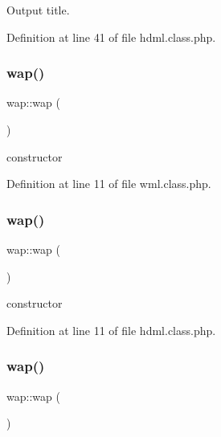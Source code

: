 Output title. 



Definition at line 41 of file hdml.\+class.\+php.

\mbox{\label{classwap_a7b4befeef8257c63a0ffe3012a84560b}} 
\subsubsection{\texorpdfstring{wap()}{wap()}\hspace{0.1cm}{\footnotesize\ttfamily [1/3]}}
{\footnotesize\ttfamily wap\+::wap (\begin{DoxyParamCaption}{ }\end{DoxyParamCaption})}



constructor 



Definition at line 11 of file wml.\+class.\+php.

\mbox{\label{classwap_a7b4befeef8257c63a0ffe3012a84560b}} 
\subsubsection{\texorpdfstring{wap()}{wap()}\hspace{0.1cm}{\footnotesize\ttfamily [2/3]}}
{\footnotesize\ttfamily wap\+::wap (\begin{DoxyParamCaption}{ }\end{DoxyParamCaption})}



constructor 



Definition at line 11 of file hdml.\+class.\+php.

\mbox{\label{classwap_a7b4befeef8257c63a0ffe3012a84560b}} 
\subsubsection{\texorpdfstring{wap()}{wap()}\hspace{0.1cm}{\footnotesize\ttfamily [3/3]}}
{\footnotesize\ttfamily wap\+::wap (\begin{DoxyParamCaption}{ }\end{DoxyParamCaption})}



